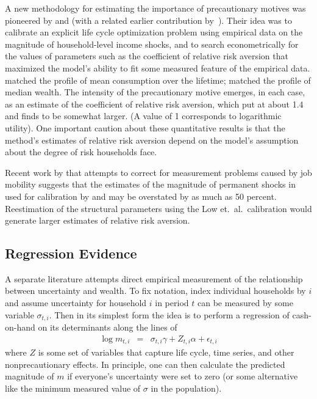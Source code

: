A new methodology for estimating the importance of precautionary motives was pioneered by
\cite{gpCoverLC} and \cite{cagettiWprofiles} (with a related earlier contribution
by~\cite{palumbo:medical}).  Their idea was to calibrate an explicit life cycle optimization problem using
empirical data on the magnitude of household-level income shocks, and to search econometrically for the values
of parameters such as the coefficient of relative risk aversion that maximized the model's ability to fit some
measured feature of the empirical data.  \cite{gpCoverLC} matched the profile of mean
consumption over the lifetime; \cite{cagettiWprofiles} matched the profile of median wealth.  The intensity of
the precautionary motive emerges, in each case, as an estimate of the coefficient of relative risk aversion,
which \cite{gpCoverLC} put at about 1.4 and \cite{cagettiWprofiles} finds to be somewhat
larger. (A value of 1 corresponds to logarithmic utility).  One important caution about these quantitative
results is that the method's estimates of relative risk aversion depend on the model's assumption about the
degree of risk households face.  
\begin{comment} %
Recent work by \cite{lmp:wagerisk} suggests that the estimates of the magnitude
of permanent shocks in \cite{carroll&samwick:nature} used for calibration by \cite{gpCoverLC}
and \cite{cagettiWprofiles} may be overstated by as much as 50 percent.
\end{comment}
Recent work by \cite{lmp:wagerisk} that attempts to correct for measurement problems caused by 
job mobility suggests that the estimates of the magnitude
of permanent shocks in \cite{carroll&samwick:nature} used for calibration by \cite{gpCoverLC}
and \cite{cagettiWprofiles} may be overstated by as much as 50 percent.
Reestimation of the structural parameters
using the Low et.\ al.\ calibration would generate larger estimates of relative risk aversion.

\subsection{Regression Evidence}

A separate literature attempts direct empirical measurement of the
relationship between uncertainty and wealth.  To fix notation, index
individual households by $i$ and assume uncertainty for household $i$
in period $t$ can be measured by some variable $\sigma_{t,i}$. Then in
its simplest form the idea is to perform a regression of cash-on-hand on 
its determinants along the lines of
\begin{eqnarray}
  \log {m}_{t,i} & = & \sigma_{t,i} \gamma + Z_{t,i} \alpha + \epsilon_{t,i}
\end{eqnarray}
where $Z$ is some set of variables that capture life cycle, time
series, and other nonprecautionary effects.  In principle, one can
then calculate the predicted magnitude of ${m}$ if everyone's
uncertainty were set to zero (or some alternative like the minimum
measured value of $\sigma$ in the population).

